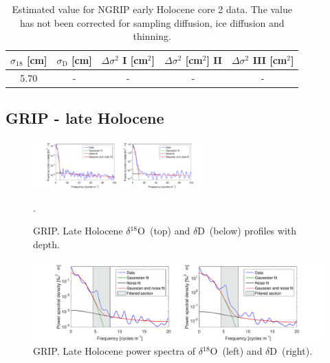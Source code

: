\documentclass[11pt, draftcls, onecolumn]{IEEEtran} %
\numberwithin{equation}{section}
\numberwithin{table}{section}
\numberwithin{figure}{section}
\newcommand{\delOx}{$\delta{}^{18}\mathrm{O}$}
\newcommand{\delD}{$\delta\mathrm{D}$}
\begin{document}
\begin{appendices}
\begin{table}[H]
	\center
	\caption{Estimated value for NGRIP early Holocene core 2 data.
		The value has not been corrected for sampling diffusion, ice diffusion and thinning.}
	\label{NGRIP_early2_holo}
	\begin{tabular}{c c c c c} 
		\toprule
		$\sigma_{18}$ [cm] & $\sigma_\mathrm{D}$ [cm] & $\Delta\sigma^2$ I [cm$^2$] & $\Delta\sigma^2$ [cm$^2$] II & $\Delta\sigma^2$ III [cm$^2$] \\
		\midrule
		5.70 &   - &    - &     - &     - \\
		\bottomrule		
	\end{tabular}
\end{table}

\clearpage
\subsection{GRIP - late Holocene}

\begin{figure}[H]
	\vspace*{2mm}
	\begin{center}
		\includegraphics[width=0.6\textwidth]{Figure_33}
		\caption{GRIP. Late Holocene \delOx~(top) and \delD~(below) profiles with depth.}  \label{fig:GRIP_late_holo}.
	\end{center}
\end{figure}


\begin{figure}[H]
	\vspace*{2mm}
	\begin{center}
		\includegraphics[width=1\textwidth]{Figure_34}
		\caption{GRIP. Late Holocene power spectra of \delOx~(left) and \delD~(right).}  \label{fig:GRIP_late_fig_1}
	\end{center}
\end{figure}


\end{appendices}
\end{document}
